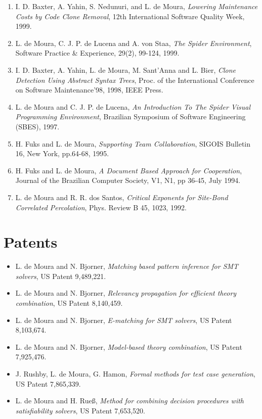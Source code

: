 \documentclass{article}
\begin{document}
\begin{enumerate}
\item I. D. Baxter, A. Yahin, S. Nedunuri, and L. de Moura,
{\em Lowering Maintenance Costs by Code Clone Removal},
12th International Software Quality Week, 1999.

\item L. de Moura, C. J. P. de Lucena and A. von Staa,
{\em The Spider Environment},
Software Practice \& Experience, 29(2), 99-124, 1999.

\item I. D. Baxter, A. Yahin, L. de Moura, M. Sant'Anna and L. Bier,
{\em Clone Detection Using Abstract Syntax Trees},
Proc. of the International Conference on Software Maintenance'98, 1998, IEEE Press.

\item L. de Moura and C. J. P. de Lucena,
{\em An Introduction To The Spider Visual Programming Environment},
Brazilian Symposium of Software Engineering (SBES), 1997.

\item H. Fuks and L. de Moura,
{\em Supporting Team Collaboration},
SIGOIS Bulletin 16, New York, pp.64-68, 1995.

\item H. Fuks and L. de Moura,
{\em A Document Based Approach for Cooperation},
Journal of the Brazilian Computer Society, V1, N1, pp 36-45, July 1994.

\item L. de Moura and R. R. dos Santos,
{\em Critical Exponents for Site-Bond Correlated Percolation},
Phys. Review B 45, 1023, 1992.
\end{enumerate}


\section*{Patents}
\begin{itemize}
\item L. de Moura and N. Bjorner, \emph{Matching based pattern inference for SMT solvers}, US Patent 9,489,221.
\item L. de Moura and N. Bjorner, \emph{Relevancy propagation for efficient theory combination}, US Patent 8,140,459.
\item L. de Moura and N. Bjorner, \emph{E-matching for SMT solvers}, US Patent 8,103,674.
\item L. de Moura and N. Bjorner, \emph{Model-based theory combination}, US Patent 7,925,476.
\item J. Rushby, L. de Moura, G. Hamon, \emph{Formal methods for test case generation}, US Patent 7,865,339.
\item L. de Moura and H. Rue\ss, \emph{Method for combining decision procedures with satisfiability solvers}, US Patent 7,653,520.
\end{itemize}
\end{document}
